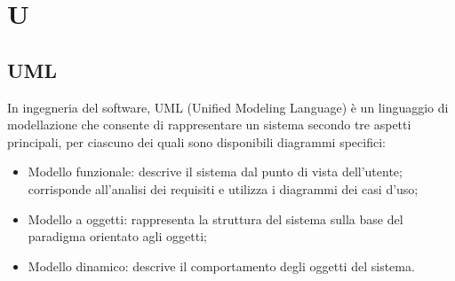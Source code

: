 \section{U}

\vspace{2em}
\subsection*{UML}
\par In ingegneria del software, UML (Unified Modeling Language) è un linguaggio di modellazione che consente di rappresentare un sistema secondo tre aspetti principali, per ciascuno dei quali sono disponibili diagrammi specifici:
\begin{itemize}
  \item Modello funzionale: descrive il sistema dal punto di vista dell'utente; corrisponde all'analisi dei requisiti e utilizza i diagrammi dei casi d'uso;
  \item Modello a oggetti: rappresenta la struttura del sistema sulla base del paradigma orientato agli oggetti;
  \item Modello dinamico: descrive il comportamento degli oggetti del sistema.
\end{itemize}
